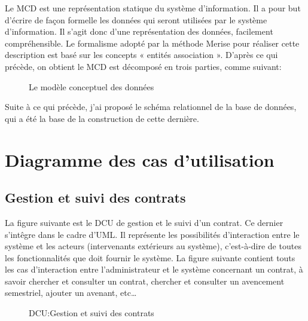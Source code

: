\documentclass[a4paper]{report}
\begin{document}
\begin{doublespace}
	Le MCD est une représentation statique du système d’information.
	Il a pour but d’écrire de façon formelle les données qui seront utilisées par le système d’information.
	Il s’agit donc d’une représentation des données, facilement compréhensible.
	Le formalisme adopté par la méthode Merise pour réaliser cette description est basé sur les concepts « entités association ».
	D’après ce qui précède, on obtient le MCD est décomposé en trois parties, comme suivant:
	\begin{figure}[H]
		\begin{center}
			\caption{Le modèle conceptuel des données}
		\end{center}
	\end{figure}
	Suite à ce qui précède, j'ai proposé le schéma relationnel de la base de données, qui a été la base de la construction de cette dernière.

	\section{Diagramme des cas d'utilisation}
	\subsection{Gestion et suivi des contrats}

	La figure suivante est le DCU de gestion et le suivi d'un contrat. Ce dernier s'intêgre
	dans le cadre d'UML. Il représente les possibilités d'interaction entre le système et les acteurs
	(intervenants extérieurs au système), c'est-à-dire de toutes les fonctionnalités que doit fournir le système.
	La figure suivante contient touts les cas d'interaction entre l'administrateur et le système concernant un contrat,
	à savoir chercher et consulter un contrat, chercher et consulter un avencement semestriel,
	ajouter un avenant, etc\dots
	\begin{figure}[H]
		\begin{center}
			\caption{DCU:Gestion et suivi des contrats}
		\end{center}
	\end{figure}


\end{doublespace}
\end{document}
